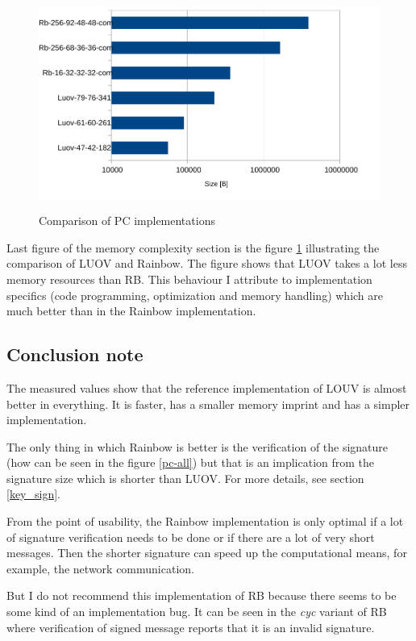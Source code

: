 \documentclass[thesis=M,english]{FITthesis}[2019/12/23]
\begin{document}
\begin{figure}[H]
\centering
\includegraphics[width=13cm,height=7cm]{images/mem-pc-all.pdf}
\caption{Comparison of PC implementations}
\label{mem-pc-all}
\end{figure}

\noindent
Last figure of the memory complexity section is the figure \ref{mem-pc-all} illustrating the comparison of LUOV and Rainbow. The figure shows that LUOV takes a lot less memory resources than RB. This behaviour I attribute to implementation specifics (code programming, optimization and memory handling) which are much better than in the Rainbow implementation. 

\subsection{Conclusion note}
The measured values show that the reference implementation of LOUV is almost better in everything. It is faster, has a smaller memory imprint and has a simpler implementation.

\bigskip
\noindent
The only thing in which Rainbow is better is the verification of the signature (how can be seen in the figure \ref{pc-all}) but that is an implication from the signature size which is shorter than LUOV. For more details, see section \ref{key_sign}.

\bigskip
\noindent
From the point of usability, the Rainbow implementation is only optimal if a lot of signature verification needs to be done or if there are a lot of very short messages. Then the shorter signature can speed up the computational means, for example, the network communication. 

\bigskip
\noindent
But I do not recommend this implementation of RB because there seems to be some kind of an implementation bug. It can be seen in the \textit{cyc} variant of RB where verification of signed message reports that it is an invalid signature.
\end{document}
